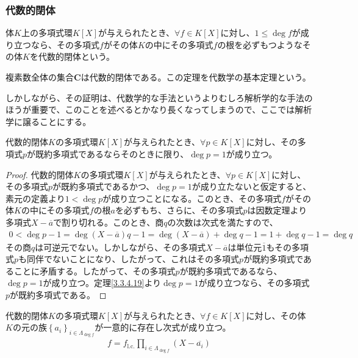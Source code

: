 \documentclass[dvipdfmx]{jsarticle}
\begin{document}
\subsubsection{代数的閉体}%
\begin{dfn}
体$K$上の多項式環$K[ X]$が与えられたとき、$\forall f \in K[ X]$に対し、$1 \leq \deg f$が成り立つなら、その多項式$f$がその体$K$の中にその多項式$f$の根を必ずもつようなその体$K$を代数的閉体という。
\end{dfn}
\begin{thm}[代数学の基本定理]\label{3.3.5.3}
複素数全体の集合$\mathbf{C}$は代数的閉体である。この定理を代数学の基本定理という。
\end{thm}\par
しかしながら、その証明は、代数学的な手法というよりむしろ解析学的な手法のほうが重要で、このことを述べるとかなり長くなってしまうので、ここでは解析学に譲ることにする。
\begin{thm}\label{3.3.5.4}
代数的閉体$K$の多項式環$K[ X]$が与えられたとき、$\forall p \in K[ X]$に対し、その多項式$p$が既約多項式であるならそのときに限り、$\deg p = 1$が成り立つ。
\end{thm}
\begin{proof}
代数的閉体$K$の多項式環$K[ X]$が与えられたとき、$\forall p \in K[ X]$に対し、その多項式$p$が既約多項式であるかつ、$\deg p = 1$が成り立たないと仮定すると、素元の定義より$1 < \deg p$が成り立つことになる。このとき、その多項式$f$がその体$K$の中にその多項式$f$の根$a$を必ずもち、さらに、その多項式$p$は因数定理より多項式$X - \overline{a}$で割り切れる。このとき、商$q$の次数は次式を満たすので、
\begin{align*}
0 < \deg p - 1 = \deg{\left( X - \overline{a} \right)q} - 1 = \deg\left( X - \overline{a} \right) + \deg q - 1 = 1 + \deg q - 1 = \deg q
\end{align*}
その商$q$は可逆元でない。しかしながら、その多項式$X - \overline{a}$は単位元$\overline{1}$もその多項式$p$も同伴でないことになり、したがって、これはその多項式$p$が既約多項式であることに矛盾する。したがって、その多項式$p$が既約多項式であるなら、$\deg p = 1$が成り立つ。定理\ref{3.3.4.19}より$\deg p = 1$が成り立つなら、その多項式$p$が既約多項式である。
\end{proof}
\begin{thm}\label{3.3.5.5}
代数的閉体$K$の多項式環$K[ X]$が与えられたとき、$\forall f \in K[ X]$に対し、その体$K$の元の族$\left\{ a_{i} \right\}_{i \in \varLambda_{\deg f}}$が一意的に存在し次式が成り立つ。
\begin{align*}
f = {f}_{\mathrm{l.c.}}\prod_{i \in \varLambda_{\deg f}} \left( X - \overline{a_{i}} \right)
\end{align*}
\end{thm}
\end{document}
